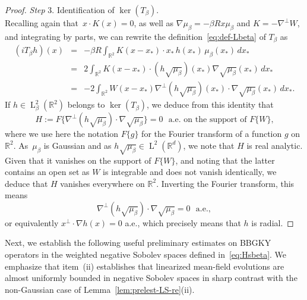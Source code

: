\documentclass[a4paper,11pt,reqno,noindent]{amsart}
\theoremstyle{plain}
\numberwithin{equation}{section}
\newcommand{\R}{\mathbb R}
\newcommand{\3}{|\!|\!|}
\newcommand{\Ld}{\operatorname{L}}
\newcommand{\step}[1]{\noindent \textit{Step} #1.}
\begin{document}
\begin{proof}
\medskip
\step3 Identification of $\ker(T_\beta)$.\\
Recalling again that~\mbox{$x\cdot K(x)=0$}, as well as $\nabla\mu_\beta=-\beta Rx\mu_\beta$ and $K=-\nabla^\bot W$, and integrating by parts, we can rewrite the definition~\eqref{eq:def-Lbeta} of $T_\beta$ as
\begin{eqnarray*}
(iT_\beta h)(x)&=&-\beta R\int_{\R^2} K(x-x_*) \cdot x_*\,h(x_*)\,\mu_\beta(x_*)\,dx_*\\
&=&2\int_{\R^2} K(x-x_*) \cdot (h\sqrt{\mu_\beta})(x_*)\nabla\sqrt{\mu_\beta}(x_*)\,dx_*\\
&=&-2\int_{\R^2} W(x-x_*) \nabla^\bot(h\sqrt{\mu_\beta})(x_*)\cdot\nabla\sqrt{\mu_\beta}(x_*)\,dx_*.
\end{eqnarray*}
If $h\in\Ld^2_\beta(\R^2)$ belongs to $\ker(T_\beta)$, we deduce from this identity that
\begin{equation*}
H:=F\big\{\nabla^\bot(h\sqrt{\mu_\beta})\cdot\nabla\sqrt{\mu_\beta}\big\}=0~~~\text{a.e. on the support of $F\{W\}$,}
\end{equation*}
where we use here the notation $F\{g\}$ for the Fourier transform of a function $g$ on $\R^2$. As~$\mu_\beta$ is Gaussian and as $h\sqrt{\mu_\beta}\in\Ld^2(\R^d)$, we note that $H$ is real analytic. Given that it vanishes on the support of $F\{W\}$, and noting that the latter contains an open set as $W$ is integrable and does not vanish identically, we deduce that $H$ vanishes everywhere on $\R^2$. Inverting the Fourier transform, this means
\[\nabla^\bot(h\sqrt{\mu_\beta})\cdot\nabla\sqrt{\mu_\beta}=0~~~\text{a.e.},\]
or equivalently $x^\bot\cdot\nabla h(x)=0$ a.e., which precisely means that $h$ is radial.
\end{proof}

Next, we establish the following useful preliminary estimates on BBGKY operators in the weighted negative Sobolev spaces defined in~\eqref{eq:Hsbeta}. We emphasize that item~(ii) establishes that linearized mean-field evolutions are almost uniformly bounded in negative Sobolev spaces in sharp contrast with the non-Gaussian case of Lemma~\ref{lem:prelest-LS-re}(ii).
\end{document}

